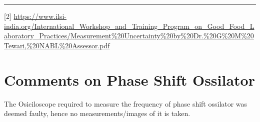 \documentclass[%
sor,
 jor,
 amsmath,amssymb,
 reprint,
]{revtex4-2}
\begin{document}
\vspace{1cm}
\hrule
\nocite{*}


[2] \url{https://www.ilsi-india.org/International_Workshop_and_Training_Program_on_Good_Food_Laboratory_Practices/Measurement%20Uncertainty%20by%20Dr.%20G%20M%20Tewari,%20NABL%20Assessor.pdf}
\hfill
\appendix

\section{Comments on Phase Shift Ossilator}
The Osiciloscope required to measure the frequency of phase shift ossilator was deemed faulty, hence no measurements/images of it is taken.
\end{document}
